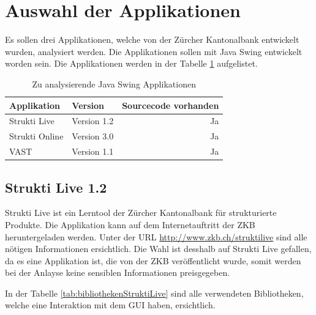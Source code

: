   \section{Auswahl der Applikationen}
  
  Es sollen drei Applikationen, welche von der Zürcher Kantonalbank entwickelt
  wurden, analysiert werden. Die Applikationen sollen mit Java Swing entwickelt
  worden sein. Die Applikationen werden in der Tabelle
  \ref{tab:zuAnalysierendeJavaSwingApplikationen} aufgelistet.
  \newline
  
  \begin{table}[ht]
    \begin{center}
      \begin{tabular}{llr}
        \toprule
        Applikation & Version & Sourcecode vorhanden \\
        \midrule
        Strukti Live & Version 1.2 & Ja\\
        Strukti Online & Version 3.0 & Ja\\
        VAST & Version 1.1 & Ja\\
        \bottomrule
      \end{tabular}
      \caption{Zu analysierende Java Swing Applikationen}
      \label{tab:zuAnalysierendeJavaSwingApplikationen}
    \end{center}
  \end{table}
  
  \subsection{Strukti Live 1.2}
  
  Strukti Live ist ein Lerntool der Zürcher Kantonalbank für strukturierte
  Produkte. Die Applikation kann auf dem Internetauftritt der ZKB
  heruntergeladen werden. Unter der \ac{URL} \url{http://www.zkb.ch/struktilive}
  sind alle nötigen Informationen ersichtlich. Die Wahl ist desshalb auf Strukti
  Live gefallen, da es eine Applikation ist, die von der ZKB veröffentlicht
  wurde, somit werden bei der Anlayse keine sensiblen Informationen
  preisgegeben.
  
  In der Tabelle \ref{tab:bibliothekenStruktiLive} sind alle verwendeten
  Bibliotheken, welche eine Interaktion mit dem \ac{GUI} haben, ersichtlich.
  \newline
  
